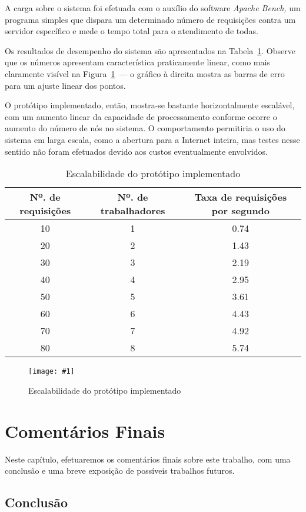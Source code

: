 \documentclass[ruledheader, 12pt]{abnt}
\newcommand{\figcustom}[4]{\par
	\begin{figure}[#3]
		\centering
		\texttt{[image: \#1]}
		\caption{\label{fig:#1}#2}
	\end{figure}
\par}
\newcommand{\tblref}[1]{Tabela~\ref{tbl:#1}}
\begin{document}
A carga sobre o sistema foi efetuada com o auxílio do software \emph{Apache Bench,} um programa simples que dispara um determinado número de requisições contra um servidor específico e mede o tempo total para o atendimento de todas.

Os resultados de desempenho do sistema são apresentados na \tblref{scale}. Observe que os números apresentam característica praticamente linear, como mais claramente visível na Figura~\ref{fig:scale}~--- o gráfico à direita mostra as barras de erro para um ajuste linear dos pontos.

O protótipo implementado, então, mostra-se bastante horizontalmente escalável, com um aumento linear da capacidade de processamento conforme ocorre o aumento do número de nós no sistema. O comportamento permitiria o uso do sistema em larga escala, como a abertura para a Internet inteira, mas testes nesse sentido não foram efetuados devido aos custos eventualmente envolvidos.

\begin{table}[p]
	\centering
	\caption{\label{tbl:scale}Escalabilidade do protótipo implementado}
	\begin{tabular}{c c c}\hline
		\hline
		Nº. de requisições & Nº. de trabalhadores & Taxa de requisições por segundo \\\hline
		\hline
		10 & 1 & 0.74 \\\hline
		20 & 2 & 1.43 \\\hline
		30 & 3 & 2.19 \\\hline
		40 & 4 & 2.95 \\\hline
		50 & 5 & 3.61 \\\hline
		60 & 6 & 4.43 \\\hline
		70 & 7 & 4.92 \\\hline
		80 & 8 & 5.74 \\\hline
		\hline
	\end{tabular}
\end{table}

\figcustom{scale}{Escalabilidade do protótipo implementado}{p}{1}

\chapter{Comentários Finais}

Neste capítulo, efetuaremos os comentários finais sobre este trabalho, com uma conclusão e uma breve exposição de possíveis trabalhos futuros.

\section{Conclusão}
\end{document}
